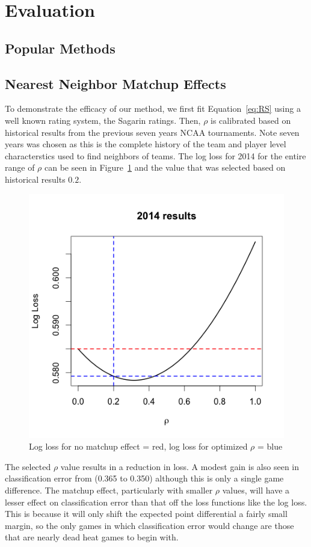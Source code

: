 \section{Evaluation}
\subsection{Popular Methods}
\subsection{Nearest Neighbor Matchup Effects}
To demonstrate the efficacy of our method, we first fit Equation~\ref{eq:RS} using a well known rating system, the Sagarin ratings.  Then, $\rho$ is calibrated based on historical results from the previous seven years NCAA tournaments.  Note seven years was chosen as this is the complete history of the team and player level characterstics used to find neighbors of teams.   The log loss for 2014 for the entire range of $\rho$ can be seen in Figure~\ref{fig:result} and the value that was selected based on historical results $0.2$.
\begin{figure}[h]
\centering
\includegraphics[width=.7\textwidth]{results_2014.png}
\caption{Log loss for no matchup effect = red, log loss for optimized $\rho$ = blue}
\label{fig:result}
\end{figure}

The selected $\rho$ value results in a reduction in loss.  A modest gain is also seen in classification error from (0.365 to 0.350) although this is only a single game difference.  The matchup effect, particularly with smaller $\rho$ values, will have a lesser effect on classification error than that off the loss functions like the log loss.  This is because it will only shift the expected point differential a fairly small margin, so the only games in which classification error would change are those that are nearly dead heat games to begin with.

